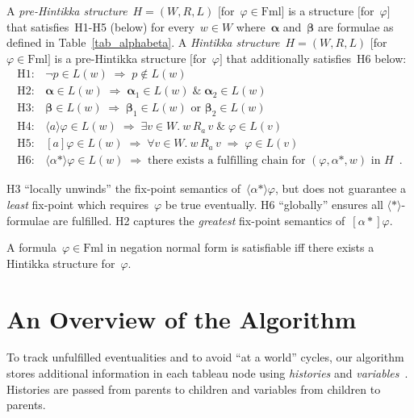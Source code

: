 \documentclass{entcs}
\newcommand{\ximp}{\;\Rightarrow\;}
\newcommand{\xand}{\;\&\;}
\newcommand{\xor}{\text{ or }}
\newcommand{\pnot}[1]{\lnot #1}
\newcommand{\pea}[2]{\langle#1\rangle #2}
\newcommand{\paa}[2]{[#1] #2}
\newcommand{\prp}[1]{#1*}
\newcommand{\fml}{\mathrm{Fml}}
\newcommand{\fear}{$\pea{\prp{}}{}$}
\newcommand{\prel}[3]{#1 \,#2\, #3}
\newcommand{\talpha}{\boldsymbol{\alpha}}
\newcommand{\tbeta}{\boldsymbol{\beta}}
\begin{document}
\begin{definition}
  A \emph{pre-Hintikka structure}~$H = (W,R,L)$ $[$for~$\varphi \in \fml]$
  is a structure $[$for~$\varphi]$
  that satisfies~H1-H5 (below) for every~$w \in W$
  where~$\talpha$ and~$\tbeta$ are formulae as defined in Table~\ref{tab_alphabeta}.
  A \emph{Hintikka structure}~$H = (W,R,L)$ $[$for~$\varphi \in \fml]$
  is a pre-Hintikka structure $[$for~$\varphi]$
  that additionally satisfies~H6 below:
  \begin{displaymath}
    \begin{array}{ll}
      \mathrm{H1:} & \pnot{p} \in L(w) \ximp p \not\in L(w)\\
      \mathrm{H2:} & \talpha \in L(w) \ximp \talpha_1 \in L(w) \xand \talpha_2 \in L(w)\\
      \mathrm{H3:} & \tbeta \in L(w) \ximp \tbeta_1 \in L(w) \xor \tbeta_2 \in L(w)\\
      \mathrm{H4:} & \pea{a}{\varphi} \in L(w) \ximp \exists v \in W.\: \prel{w}{R_a}{v} \xand \varphi \in L(v)\\
      \mathrm{H5:} & \paa{a}{\varphi} \in L(w) \ximp \forall v \in W.\: \prel{w}{R_a}{v} \ximp \varphi \in L(v)\\
      \mathrm{H6:} & \pea{\prp{\alpha}}{\varphi} \in L(w) \ximp
      \text{there exists a fulfilling chain for~$(\varphi, \prp{\alpha}, w)$ in~$H$} \enspace.
    \end{array}
  \end{displaymath}
\end{definition}
H3 ``locally unwinds'' the fix-point semantics of~$\pea{\prp{\alpha}}{\varphi}$,
but does not guarantee a \emph{least} fix-point which 
requires~$\varphi$ be true eventually.
H6 ``globally''
ensures all \fear{}-formulae are fulfilled.
H2 captures the \emph{greatest} fix-point 
semantics of~$\paa{\prp{\alpha}}{\varphi}$.

\begin{theorem}
  \label{theo_satisfiable}
  A formula~$\varphi \in \fml$ in negation normal form is satisfiable
  iff there exists a Hintikka structure for~$\varphi$.
\end{theorem}


\section{An Overview of the Algorithm}
\label{sec_overview}

To track unfulfilled eventualities and to avoid ``at a world'' cycles,
our algorithm stores additional information in each tableau node
using \emph{histories} and
\emph{variables}~\cite{schwendimann-one-pass}.
Histories are passed from parents to children and
variables from children to parents.
\end{document}
